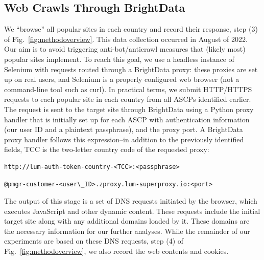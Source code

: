\subsection{Web Crawls Through BrightData}
\label{sec:crawling}
We ``browse'' all popular sites in each country and record their response,
step (3) of Fig.~\ref{fig:methodoverview}.
This data collection occurred in August of 2022.
Our aim is to avoid triggering anti-bot/anticrawl measures that (likely most) popular 
sites implement.
To reach this goal, we use a headless instance of Selenium with requests routed through a 
BrightData proxy: these proxies are set up on real users, and Selenium is 
a properly configured web browser (not a command-line tool such as curl).
In practical terms, we submit HTTP/HTTPS requests to each popular site in each country from
all ASCPs identified earlier. The request is sent to the target site through BrightData using 
a Python proxy handler that is initially set up for each ASCP 
with authentication information (our user ID and a plaintext passphrase),
and the proxy port.
A BrightData proxy handler follows this expression--in addition to the
previously identified fields, TCC is the two-letter country code of the requested proxy:
\begin{verbatim}
http://lum-auth-token-country-<TCC>:<passphrase>
\end{verbatim}
\begin{verbatim}
@pmgr-customer-<user\_ID>.zproxy.lum-superproxy.io:<port>
\end{verbatim}

The output of this stage is a set of DNS requests initiated by the browser, 
which executes JavaScript and other
dynamic content. These requests include the initial target site along with any 
additional domains loaded by it. These domains are the necessary information 
for our further analyses.
While the remainder of our experiments are 
based on these DNS requests, step (4) of Fig.~\ref{fig:methodoverview}, 
we also record the web contents and cookies.

